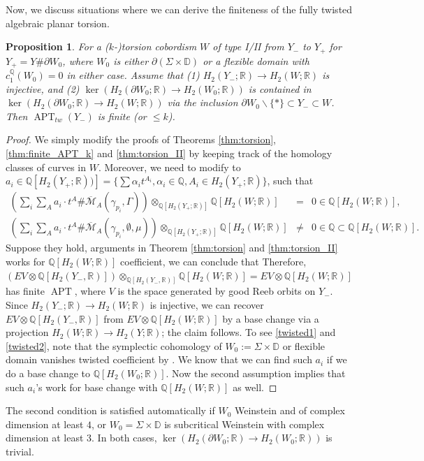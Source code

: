 \documentclass[11pt]{amsart}
\numberwithin{equation}{section}
\newtheorem{proposition}[theorem]{\textbf{Proposition}}
\def\R{\mathbb{R}}
\def\D{{\mathbb D}}
\def\Q{{\mathbb Q}}
\def\cM{{\mathcal M}}
\DeclareMathOperator{\APT}{APT}
\begin{document}
Now, we discuss situations where we can derive the finiteness of the fully twisted algebraic planar torsion.
\begin{proposition}\label{prop:twisted}
    For a ($k$-)torsion cobordism $W$ of type I/II from $Y_-$ to $Y_+$ for $Y_+=Y\#\partial W_0$, where $W_0$ is either $\partial(\Sigma\times \D)$ or a flexible domain with $c_1^{\Q}(W_0)=0$ in either case. Assume that (1) $H_2(Y_-;\R)\to H_2(W;\R)$ is injective, and (2) $\ker(H_2(\partial W_0;\R)\to H_2(W_0;\R))$ is contained in $\ker(H_2(\partial W_0;\R)\to H_2(W;\R))$ via the inclusion $\partial W_0\backslash \{*\} \subset Y_-\subset W$. Then $\APT_{tw}(Y_-)$ is finite (or $\le k$).
\end{proposition}
\begin{proof}
We simply modify the proofs of Theorems \ref{thm:torsion}, \ref{thm:finite_APT_k} and \ref{thm:torsion_II} by keeping track of the homology classes of curves in $W$. Moreover, we need to modify  to 
$a_i\in \Q[H_2(Y_+;\R))]=\{\sum \alpha_i t^{A_i}, \alpha_i\in \Q, A_i\in H_2(Y_+;\R)\}$, such that 
\begin{eqnarray}
(\sum_i\sum_A a_i\cdot t^A \#\overline{\cM}_{A}(\gamma_{p_i},\Gamma))\otimes_{\Q[H_2(Y_+;\R)]}\Q[H_2(W;\R)] & = & 0\in \Q[H_2(W;\R)] \label{twisted1},\\
(\sum_i\sum_A a_i\cdot t^A \#\overline{\cM}_{A}(\gamma_{p_i},\emptyset,\mu))\otimes_{\Q[H_2(Y_+;\R)]}\Q[H_2(W;\R)] &\ne &0\in \Q\subset \Q[H_2(W;\R)]. \label{twisted2}
\end{eqnarray}
Suppose they hold, arguments in Theorem \ref{thm:torsion} and \ref{thm:torsion_II} works for $\Q[H_2(W;\R)]$ coefficient, we can conclude that Therefore, $(EV\otimes \Q[H_2(Y_-,\R)])\otimes_{\Q[H_2(Y_-,\R)]} \Q[H_2(W;\R)] = EV\otimes \Q[H_2(W;\R)]$ has finite $\APT$, where $V$ is the space generated by good Reeb orbits on $Y_-$. Since $H_2(Y_-;\R)\to H_2(W;\R)$ is injective, we can recover $EV\otimes \Q[H_2(Y_-,\R)]$ from $EV\otimes \Q[H_2(W;\R)]$ by a base change via a projection $H_2(W;\R)\to H_2(Y;\R)$; the claim follows. To see \eqref{twisted1} and \eqref{twisted2}, note that the symplectic cohomology of $W_0:=\Sigma \times \D$ or flexible domain vanishes twisted coefficient by \cite[Theorem 3.2]{zbMATH06864340}. We know that we can find such $a_i$ if we do a base change to $\Q[H_2(W_0;\R)]$. Now the second assumption implies that such $a_i$'s work for base change with $\Q[H_2(W;\R)]$ as well.
\end{proof}
The second condition is satisfied automatically if $W_0$ Weinstein and of complex dimension at least $4$, or $W_0=\Sigma \times \D$ is subcritical Weinstein with complex dimension at least $3$. In both cases, $\ker(H_2(\partial W_0;\R)\to H_2(W_0;\R))$ is trivial. 
    
\end{document}
